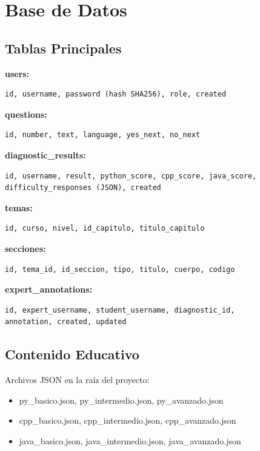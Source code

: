 \documentclass[12pt,a4paper]{article}
\begin{document}
\section{Base de Datos}

\subsection{Tablas Principales}

\textbf{users:}
\begin{verbatim}
id, username, password (hash SHA256), role, created
\end{verbatim}

\textbf{questions:}
\begin{verbatim}
id, number, text, language, yes_next, no_next
\end{verbatim}

\textbf{diagnostic\_results:}
\begin{verbatim}
id, username, result, python_score, cpp_score, java_score, 
difficulty_responses (JSON), created
\end{verbatim}

\textbf{temas:}
\begin{verbatim}
id, curso, nivel, id_capitulo, titulo_capitulo
\end{verbatim}

\textbf{secciones:}
\begin{verbatim}
id, tema_id, id_seccion, tipo, titulo, cuerpo, codigo
\end{verbatim}

\textbf{expert\_annotations:}
\begin{verbatim}
id, expert_username, student_username, diagnostic_id, 
annotation, created, updated
\end{verbatim}

\subsection{Contenido Educativo}
Archivos JSON en la raíz del proyecto:
\begin{itemize}
    \item py\_basico.json, py\_intermedio.json, py\_avanzado.json
    \item cpp\_basico.json, cpp\_intermedio.json, cpp\_avanzado.json
    \item java\_basico.json, java\_intermedio.json, java\_avanzado.json
\end{itemize}
\end{document}
